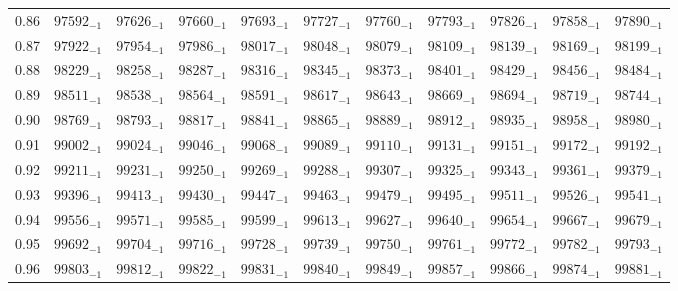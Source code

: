 \documentclass[10pt, a4paper]{article}
\begin{document}
\begin{center}
\begin{longtable}{c || c c c c c | c c c c c}
        0.86 & \({97592}_{-1}\) & \({97626}_{-1}\) & \({97660}_{-1}\) & \({97693}_{-1}\) & \({97727}_{-1}\) & \({97760}_{-1}\) & \({97793}_{-1}\) & \({97826}_{-1}\) & \({97858}_{-1}\) & \({97890}_{-1}\)\\
        0.87 & \({97922}_{-1}\) & \({97954}_{-1}\) & \({97986}_{-1}\) & \({98017}_{-1}\) & \({98048}_{-1}\) & \({98079}_{-1}\) & \({98109}_{-1}\) & \({98139}_{-1}\) & \({98169}_{-1}\) & \({98199}_{-1}\)\\
        0.88 & \({98229}_{-1}\) & \({98258}_{-1}\) & \({98287}_{-1}\) & \({98316}_{-1}\) & \({98345}_{-1}\) & \({98373}_{-1}\) & \({98401}_{-1}\) & \({98429}_{-1}\) & \({98456}_{-1}\) & \({98484}_{-1}\)\\
        0.89 & \({98511}_{-1}\) & \({98538}_{-1}\) & \({98564}_{-1}\) & \({98591}_{-1}\) & \({98617}_{-1}\) & \({98643}_{-1}\) & \({98669}_{-1}\) & \({98694}_{-1}\) & \({98719}_{-1}\) & \({98744}_{-1}\)\\
        \hline
        0.90 & \({98769}_{-1}\) & \({98793}_{-1}\) & \({98817}_{-1}\) & \({98841}_{-1}\) & \({98865}_{-1}\) & \({98889}_{-1}\) & \({98912}_{-1}\) & \({98935}_{-1}\) & \({98958}_{-1}\) & \({98980}_{-1}\)\\
        0.91 & \({99002}_{-1}\) & \({99024}_{-1}\) & \({99046}_{-1}\) & \({99068}_{-1}\) & \({99089}_{-1}\) & \({99110}_{-1}\) & \({99131}_{-1}\) & \({99151}_{-1}\) & \({99172}_{-1}\) & \({99192}_{-1}\)\\
        0.92 & \({99211}_{-1}\) & \({99231}_{-1}\) & \({99250}_{-1}\) & \({99269}_{-1}\) & \({99288}_{-1}\) & \({99307}_{-1}\) & \({99325}_{-1}\) & \({99343}_{-1}\) & \({99361}_{-1}\) & \({99379}_{-1}\)\\
        0.93 & \({99396}_{-1}\) & \({99413}_{-1}\) & \({99430}_{-1}\) & \({99447}_{-1}\) & \({99463}_{-1}\) & \({99479}_{-1}\) & \({99495}_{-1}\) & \({99511}_{-1}\) & \({99526}_{-1}\) & \({99541}_{-1}\)\\
        0.94 & \({99556}_{-1}\) & \({99571}_{-1}\) & \({99585}_{-1}\) & \({99599}_{-1}\) & \({99613}_{-1}\) & \({99627}_{-1}\) & \({99640}_{-1}\) & \({99654}_{-1}\) & \({99667}_{-1}\) & \({99679}_{-1}\)\\
        0.95 & \({99692}_{-1}\) & \({99704}_{-1}\) & \({99716}_{-1}\) & \({99728}_{-1}\) & \({99739}_{-1}\) & \({99750}_{-1}\) & \({99761}_{-1}\) & \({99772}_{-1}\) & \({99782}_{-1}\) & \({99793}_{-1}\)\\
        0.96 & \({99803}_{-1}\) & \({99812}_{-1}\) & \({99822}_{-1}\) & \({99831}_{-1}\) & \({99840}_{-1}\) & \({99849}_{-1}\) & \({99857}_{-1}\) & \({99866}_{-1}\) & \({99874}_{-1}\) & \({99881}_{-1}\)\\

\end{longtable}
\end{center}
\end{document}
